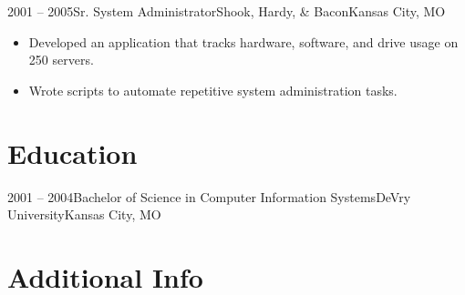 \documentclass[11pt,letterpaper,final]{moderncv}
\begin{document}
	\cventry
{2001 -- 2005}{Sr. System Administrator}{Shook, Hardy, \& Bacon}{Kansas City, MO}{}{
	\begin{itemize}
		\item Developed an application that tracks hardware, software, and drive usage on 250 servers.
		\item Wrote scripts to automate repetitive system administration tasks.
	\end{itemize}
	}

\section{Education} 
	\cventry
{2001 -- 2004}{Bachelor of Science in Computer Information Systems}{DeVry University}{Kansas City, MO}{}{}

\section{Additional Info}
	\cvlistitem{My first computer was an Apple {][}.}
\end{document}
